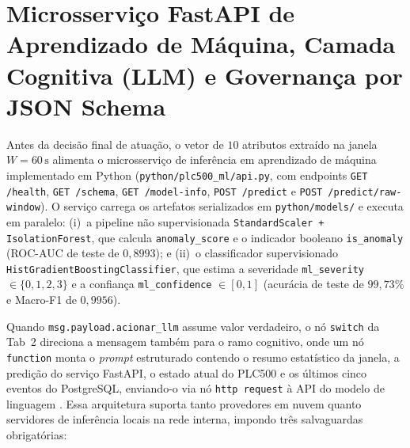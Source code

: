 \section{Microsserviço FastAPI de Aprendizado de Máquina, Camada Cognitiva (LLM) e Governança por JSON Schema}
\label{sec:nodered_ia}

Antes da decisão final de atuação, o vetor de $10$ atributos extraído na janela $W = 60\,\text{s}$ alimenta o microsserviço de inferência em aprendizado de máquina implementado em Python (\texttt{python/\allowbreak plc500\_\allowbreak ml/\allowbreak api.py}, com endpoints \texttt{GET /health}, \texttt{GET /schema}, \texttt{GET /model-info}, \texttt{POST /predict} e \texttt{POST /predict/raw-window}). O serviço carrega os artefatos serializados em \texttt{python/\allowbreak models/} e executa em paralelo: (i)~a pipeline não supervisionada \texttt{StandardScaler + IsolationForest}, que calcula \texttt{anomaly\_\allowbreak score} e o indicador booleano \texttt{is\_\allowbreak anomaly} (ROC-AUC de teste de $0{,}8993$); e (ii)~o classificador supervisionado \texttt{HistGradient\allowbreak Boosting\allowbreak Classifier}, que estima a severidade \texttt{ml\_\allowbreak severity} $\in \{0,1,2,3\}$ e a confiança \texttt{ml\_\allowbreak confidence} $\in [0,1]$ (acurácia de teste de $99{,}73\%$ e Macro-F1 de $0{,}9956$).

Quando \texttt{msg.payload.acionar\_llm} assume valor verdadeiro, o nó \texttt{switch} da Tab~2 direciona a mensagem também para o ramo cognitivo, onde um nó \texttt{function} monta o \textit{prompt} estruturado contendo o resumo estatístico da janela, a predição do serviço FastAPI, o estado atual do PLC500 e os últimos cinco eventos do PostgreSQL, enviando-o via nó \texttt{http request} à API do modelo de linguagem \cite{nodered_docs}. Essa arquitetura suporta tanto provedores em nuvem quanto servidores de inferência locais na rede interna, impondo três salvaguardas obrigatórias:

